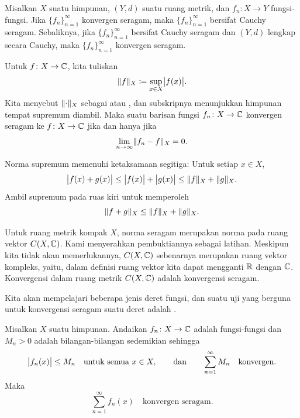 \begin{prop} \label{prop:unifcauchymetric}
Misalkan $X$ suatu himpunan, $(Y,d)$ suatu ruang metrik, dan
$f_n \colon X \to Y$ fungsi-fungsi.
Jika $\{ f_n \}_{n=1}^\infty$ konvergen seragam,
maka $\{f_n\}_{n=1}^\infty$ bersifat Cauchy seragam. Sebaliknya, jika
$\{f_n\}_{n=1}^\infty$ bersifat Cauchy seragam dan $(Y,d)$ lengkap secara Cauchy,
maka $\{f_n\}_{n=1}^\infty$ konvergen seragam.
\end{prop}

Untuk $f \colon X \to {\mathbb{C}}$, kita tuliskan
\begin{equation*}
\lVert {f} \rVert_X \coloneqq \sup_{x \in X} \bigl\lvert {f(x)} \bigr\rvert .
\end{equation*}
Kita menyebut $\lVert {\cdot} \rVert_X$
sebagai \emph{} atau \emph{},
dan subskripnya menunjukkan himpunan tempat supremum diambil.
Maka suatu barisan fungsi
$f_n \colon X \to {\mathbb{C}}$ konvergen seragam ke $f \colon X \to {\mathbb{C}}$ jika dan hanya jika
\begin{equation*}
\lim_{n\to \infty} \lVert {f_n-f} \rVert_X = 0 .
\end{equation*}

Norma supremum memenuhi ketaksamaan segitiga: Untuk setiap $x \in X$,
\begin{equation*}
\bigl\lvert {f(x)+g(x)} \bigr\rvert \leq
\bigl\lvert {f(x)} \bigr\rvert+\bigl\lvert {g(x)} \bigr\rvert \leq
\lVert {f} \rVert_X+\lVert {g} \rVert_X .
\end{equation*}
Ambil supremum pada ruas kiri untuk memperoleh
\begin{equation*}
\lVert {f+g} \rVert_X \leq
\lVert {f} \rVert_X+\lVert {g} \rVert_X .
\end{equation*}

Untuk ruang metrik kompak $X$,
norma seragam merupakan norma pada ruang vektor $C(X,{\mathbb{C}})$.
Kami menyerahkan pembuktiannya sebagai latihan.
Meskipun kita tidak akan memerlukannya, $C(X,{\mathbb{C}})$ sebenarnya merupakan ruang
vektor kompleks, yaitu, dalam definisi ruang vektor kita dapat mengganti
${\mathbb{R}}$ dengan ${\mathbb{C}}$.
Konvergensi dalam ruang metrik $C(X,{\mathbb{C}})$ adalah
konvergensi seragam.

Kita akan mempelajari beberapa jenis deret fungsi, dan
suatu uji yang berguna untuk konvergensi seragam suatu deret adalah
\emph{}.

\begin{thm} \label{thm:weiermtest}
Misalkan $X$ suatu himpunan.
Andaikan $f_n \colon X \to {\mathbb{C}}$ adalah fungsi-fungsi dan $M_n > 0$ adalah bilangan-bilangan sedemikian
sehingga
\begin{equation*}
\bigl\lvert {f_n(x)} \bigr\rvert\leq M_n \quad \text{untuk semua } x \in X,
\qquad \text{dan} \qquad
\sum_{n=1}^\infty M_n
\quad \text{konvergen}.
\end{equation*}
Maka
\begin{equation*}
\sum_{n=1}^\infty f_n(x)
\quad \text{konvergen seragam}.
\end{equation*}
\end{thm}

